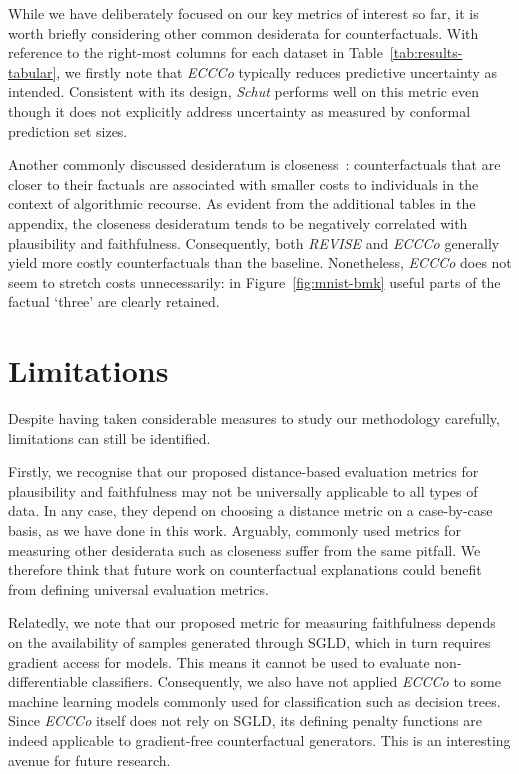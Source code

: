 \documentclass[letterpaper]{article} %
\begin{document}
While we have deliberately focused on our key metrics of interest so far, it is worth briefly considering other common desiderata for counterfactuals. With reference to the right-most columns for each dataset in Table~\ref{tab:results-tabular}, we firstly note that \textit{ECCCo} typically reduces predictive uncertainty as intended. Consistent with its design, \textit{Schut} performs well on this metric even though it does not explicitly address uncertainty as measured by conformal prediction set sizes. 

Another commonly discussed desideratum is closeness~\citep{wachter2017counterfactual}: counterfactuals that are closer to their factuals are associated with smaller costs to individuals in the context of algorithmic recourse. As evident from the additional tables in the appendix, the closeness desideratum tends to be negatively correlated with plausibility and faithfulness. Consequently, both \textit{REVISE} and \textit{ECCCo} generally yield more costly counterfactuals than the baseline. Nonetheless, \textit{ECCCo} does not seem to stretch costs unnecessarily: in Figure~\ref{fig:mnist-bmk} useful parts of the factual `three' are clearly retained.

\section{Limitations}

Despite having taken considerable measures to study our methodology carefully, limitations can still be identified. 

Firstly, we recognise that our proposed distance-based evaluation metrics for plausibility and faithfulness may not be universally applicable to all types of data. In any case, they depend on choosing a distance metric on a case-by-case basis, as we have done in this work. Arguably, commonly used metrics for measuring other desiderata such as closeness suffer from the same pitfall. We therefore think that future work on counterfactual explanations could benefit from defining universal evaluation metrics. 

Relatedly, we note that our proposed metric for measuring faithfulness depends on the availability of samples generated through SGLD, which in turn requires gradient access for models. This means it cannot be used to evaluate non-differentiable classifiers. Consequently, we also have not applied \textit{ECCCo} to some machine learning models commonly used for classification such as decision trees. Since \textit{ECCCo} itself does not rely on SGLD, its defining penalty functions are indeed applicable to gradient-free counterfactual generators. This is an interesting avenue for future research.
\end{document}
